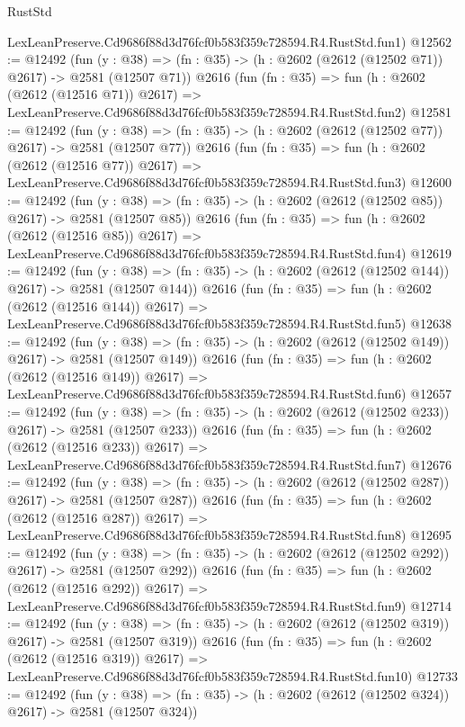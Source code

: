 \begin{lexlean}{RustStd}
\begin{coremodule}
    LexLeanPreserve.Cd9686f88d3d76fcf0b583f359c728594.R4.RustStd.fun1)
@12562 := @12492
    (fun (y : @38) => (fn : @35) -> (h : @2602 (@2612 (@12502 @71)) @2617) -> @2581 (@12507 @71))
    @2616
    (fun (fn : @35) =>
    fun (h : @2602 (@2612 (@12516 @71)) @2617) =>
    LexLeanPreserve.Cd9686f88d3d76fcf0b583f359c728594.R4.RustStd.fun2)
@12581 := @12492
    (fun (y : @38) => (fn : @35) -> (h : @2602 (@2612 (@12502 @77)) @2617) -> @2581 (@12507 @77))
    @2616
    (fun (fn : @35) =>
    fun (h : @2602 (@2612 (@12516 @77)) @2617) =>
    LexLeanPreserve.Cd9686f88d3d76fcf0b583f359c728594.R4.RustStd.fun3)
@12600 := @12492
    (fun (y : @38) => (fn : @35) -> (h : @2602 (@2612 (@12502 @85)) @2617) -> @2581 (@12507 @85))
    @2616
    (fun (fn : @35) =>
    fun (h : @2602 (@2612 (@12516 @85)) @2617) =>
    LexLeanPreserve.Cd9686f88d3d76fcf0b583f359c728594.R4.RustStd.fun4)
@12619 := @12492
    (fun (y : @38) => (fn : @35) -> (h : @2602 (@2612 (@12502 @144)) @2617) -> @2581 (@12507 @144))
    @2616
    (fun (fn : @35) =>
    fun (h : @2602 (@2612 (@12516 @144)) @2617) =>
    LexLeanPreserve.Cd9686f88d3d76fcf0b583f359c728594.R4.RustStd.fun5)
@12638 := @12492
    (fun (y : @38) => (fn : @35) -> (h : @2602 (@2612 (@12502 @149)) @2617) -> @2581 (@12507 @149))
    @2616
    (fun (fn : @35) =>
    fun (h : @2602 (@2612 (@12516 @149)) @2617) =>
    LexLeanPreserve.Cd9686f88d3d76fcf0b583f359c728594.R4.RustStd.fun6)
@12657 := @12492
    (fun (y : @38) => (fn : @35) -> (h : @2602 (@2612 (@12502 @233)) @2617) -> @2581 (@12507 @233))
    @2616
    (fun (fn : @35) =>
    fun (h : @2602 (@2612 (@12516 @233)) @2617) =>
    LexLeanPreserve.Cd9686f88d3d76fcf0b583f359c728594.R4.RustStd.fun7)
@12676 := @12492
    (fun (y : @38) => (fn : @35) -> (h : @2602 (@2612 (@12502 @287)) @2617) -> @2581 (@12507 @287))
    @2616
    (fun (fn : @35) =>
    fun (h : @2602 (@2612 (@12516 @287)) @2617) =>
    LexLeanPreserve.Cd9686f88d3d76fcf0b583f359c728594.R4.RustStd.fun8)
@12695 := @12492
    (fun (y : @38) => (fn : @35) -> (h : @2602 (@2612 (@12502 @292)) @2617) -> @2581 (@12507 @292))
    @2616
    (fun (fn : @35) =>
    fun (h : @2602 (@2612 (@12516 @292)) @2617) =>
    LexLeanPreserve.Cd9686f88d3d76fcf0b583f359c728594.R4.RustStd.fun9)
@12714 := @12492
    (fun (y : @38) => (fn : @35) -> (h : @2602 (@2612 (@12502 @319)) @2617) -> @2581 (@12507 @319))
    @2616
    (fun (fn : @35) =>
    fun (h : @2602 (@2612 (@12516 @319)) @2617) =>
    LexLeanPreserve.Cd9686f88d3d76fcf0b583f359c728594.R4.RustStd.fun10)
@12733 := @12492
    (fun (y : @38) => (fn : @35) -> (h : @2602 (@2612 (@12502 @324)) @2617) -> @2581 (@12507 @324))

\end{coremodule}
\end{lexlean}
